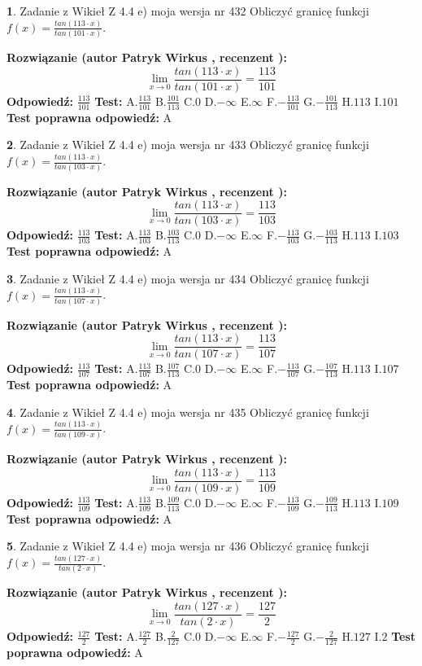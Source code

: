 \documentclass[12pt, a4paper]{article}
\theoremstyle{definition} %
\newtheorem{zad}{}
\newcommand{\zadStart}[1]{\begin{zad}#1\newline}
\newcommand{\zadStop}{\end{zad}}
\newcommand{\rozwStart}[2]{\noindent \textbf{Rozwiązanie (autor #1 , recenzent #2): }\newline}
\newcommand{\rozwStop}{\newline}
\newcommand{\odpStart}{\noindent \textbf{Odpowiedź:}\newline}
\newcommand{\odpStop}{\newline}
\newcommand{\testStart}{\noindent \textbf{Test:}\newline}
\newcommand{\testStop}{\newline}
\newcommand{\kluczStart}{\noindent \textbf{Test poprawna odpowiedź:}\newline}
\newcommand{\kluczStop}{\newline}
\begin{document}
\zadStart{Zadanie z Wikieł Z 4.4 e) moja wersja nr 432}
Obliczyć granicę funkcji $f(x)=\frac{tan(113\cdot x)}{tan(101\cdot x)}$.
\zadStop
\rozwStart{Patryk Wirkus}{}
$$\lim\limits_{x\to 0}\frac{tan(113\cdot x)}{tan(101\cdot x)}=
\frac{113}{101}$$
\rozwStop
\odpStart
$\frac{113}{101}$
\odpStop
\testStart
A.$\frac{113}{101}$
B.$\frac{101}{113}$
C.$0$
D.$-\infty$
E.$\infty$
F.$-\frac{113}{101}$
G.$-\frac{101}{113}$
H.$113$
I.$101$
\testStop
\kluczStart
A
\kluczStop



\zadStart{Zadanie z Wikieł Z 4.4 e) moja wersja nr 433}
Obliczyć granicę funkcji $f(x)=\frac{tan(113\cdot x)}{tan(103\cdot x)}$.
\zadStop
\rozwStart{Patryk Wirkus}{}
$$\lim\limits_{x\to 0}\frac{tan(113\cdot x)}{tan(103\cdot x)}=
\frac{113}{103}$$
\rozwStop
\odpStart
$\frac{113}{103}$
\odpStop
\testStart
A.$\frac{113}{103}$
B.$\frac{103}{113}$
C.$0$
D.$-\infty$
E.$\infty$
F.$-\frac{113}{103}$
G.$-\frac{103}{113}$
H.$113$
I.$103$
\testStop
\kluczStart
A
\kluczStop



\zadStart{Zadanie z Wikieł Z 4.4 e) moja wersja nr 434}
Obliczyć granicę funkcji $f(x)=\frac{tan(113\cdot x)}{tan(107\cdot x)}$.
\zadStop
\rozwStart{Patryk Wirkus}{}
$$\lim\limits_{x\to 0}\frac{tan(113\cdot x)}{tan(107\cdot x)}=
\frac{113}{107}$$
\rozwStop
\odpStart
$\frac{113}{107}$
\odpStop
\testStart
A.$\frac{113}{107}$
B.$\frac{107}{113}$
C.$0$
D.$-\infty$
E.$\infty$
F.$-\frac{113}{107}$
G.$-\frac{107}{113}$
H.$113$
I.$107$
\testStop
\kluczStart
A
\kluczStop



\zadStart{Zadanie z Wikieł Z 4.4 e) moja wersja nr 435}
Obliczyć granicę funkcji $f(x)=\frac{tan(113\cdot x)}{tan(109\cdot x)}$.
\zadStop
\rozwStart{Patryk Wirkus}{}
$$\lim\limits_{x\to 0}\frac{tan(113\cdot x)}{tan(109\cdot x)}=
\frac{113}{109}$$
\rozwStop
\odpStart
$\frac{113}{109}$
\odpStop
\testStart
A.$\frac{113}{109}$
B.$\frac{109}{113}$
C.$0$
D.$-\infty$
E.$\infty$
F.$-\frac{113}{109}$
G.$-\frac{109}{113}$
H.$113$
I.$109$
\testStop
\kluczStart
A
\kluczStop



\zadStart{Zadanie z Wikieł Z 4.4 e) moja wersja nr 436}
Obliczyć granicę funkcji $f(x)=\frac{tan(127\cdot x)}{tan(2\cdot x)}$.
\zadStop
\rozwStart{Patryk Wirkus}{}
$$\lim\limits_{x\to 0}\frac{tan(127\cdot x)}{tan(2\cdot x)}=
\frac{127}{2}$$
\rozwStop
\odpStart
$\frac{127}{2}$
\odpStop
\testStart
A.$\frac{127}{2}$
B.$\frac{2}{127}$
C.$0$
D.$-\infty$
E.$\infty$
F.$-\frac{127}{2}$
G.$-\frac{2}{127}$
H.$127$
I.$2$
\testStop
\kluczStart
A
\kluczStop
\end{document}
